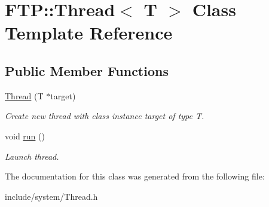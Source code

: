 \hypertarget{class_f_t_p_1_1_thread}{\section{F\-T\-P\-:\-:Thread$<$ T $>$ Class Template Reference}
\label{class_f_t_p_1_1_thread}
}
\subsection*{Public Member Functions}
\begin{DoxyCompactItemize}
\item 
\hypertarget{class_f_t_p_1_1_thread_a05e8388a05898b5e12ad102686bc370f}{\hyperlink{class_f_t_p_1_1_thread_a05e8388a05898b5e12ad102686bc370f}{Thread} (T $\ast$target)}\label{class_f_t_p_1_1_thread_a05e8388a05898b5e12ad102686bc370f}

\begin{DoxyCompactList}\small\item\em Create new thread with class instance target of type T. \end{DoxyCompactList}\item 
\hypertarget{class_f_t_p_1_1_thread_adb6eb9864223b888a2d20e7349e0d57a}{void \hyperlink{class_f_t_p_1_1_thread_adb6eb9864223b888a2d20e7349e0d57a}{run} ()}\label{class_f_t_p_1_1_thread_adb6eb9864223b888a2d20e7349e0d57a}

\begin{DoxyCompactList}\small\item\em Launch thread. \end{DoxyCompactList}\end{DoxyCompactItemize}


The documentation for this class was generated from the following file\-:\begin{DoxyCompactItemize}
\item 
include/system/Thread.\-h\end{DoxyCompactItemize}
